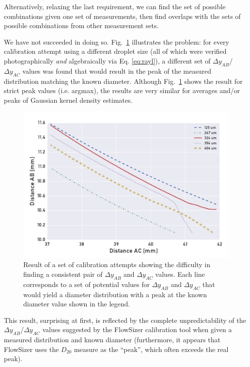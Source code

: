 \documentclass[11.5pt,oneside]{book}
\newcommand*{\figref}[1]{Fig.~\ref{#1}}
\begin{document}
Alternatively, relaxing the last requirement, we can find the set of
possible combinations given one set of measurements, then find overlaps
with the sets of possible combinations from other measurement sets.

We have not succeeded in doing so. \figref{fig:pdpa-zerorelations} illustrates
the problem: for every calibration attempt using a different droplet size (all
of which were verified photographically \emph{and} algebraically via Eq.
\eqref{eq:rayl}), a different set of $\Delta y_{AB}$/$\Delta y_{AC}$ values was
found that would result in the peak of the measured distribution matching the
known diameter. Although \figref{fig:pdpa-zerorelations} shows the result for
strict peak values (i.e. argmax), the results are very similar for averages
and/or peaks of Gaussian kernel density estimates.

\begin{figure}
    \centering
    \includegraphics[width=\textwidth]{img/pdpa/all-coinc-AB-AC-zerorelations.pdf}
    \caption{Result of a set of calibration attempts showing the difficulty in
            finding a consistent pair of $\Delta y_{AB}$ and $\Delta y_{AC}$
            values. Each line corresponds to a set of potential values for
    $\Delta y_{AB}$ and $\Delta y_{AC}$ that would yield a diameter distribution
    with a peak at the known diameter value shown in the legend.
    \label{fig:pdpa-zerorelations}}
\end{figure}

This result, surprising at first, is reflected by the complete unpredictability
of the $\Delta y_{AB}$/$\Delta y_{AC}$ values suggested by the FlowSizer
calibration tool when given a measured distribution and known diameter
(furthermore, it appears that FlowSizer uses the $D_{20}$ measure as the
``peak'', which often exceeds the real peak).
\end{document}
